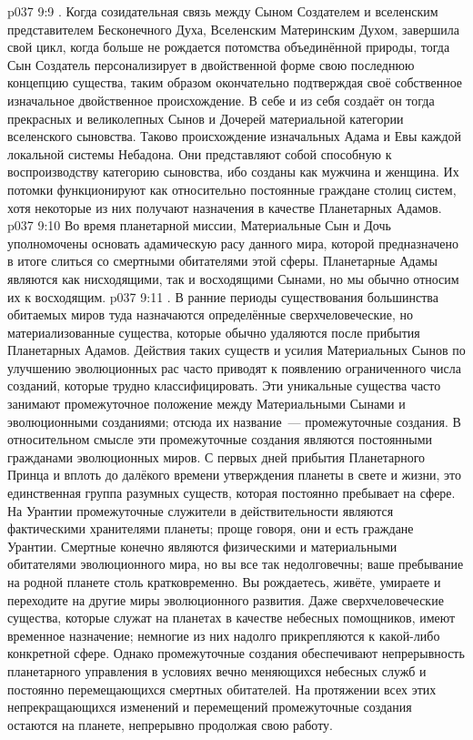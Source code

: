 \vs p037 9:9 \pc {}. Когда созидательная связь между Сыном Создателем и вселенским представителем Бесконечного Духа, Вселенским Материнским Духом, завершила свой цикл, когда больше не рождается потомства объединённой природы, тогда Сын Создатель персонализирует в двойственной форме свою последнюю концепцию существа, таким образом окончательно подтверждая своё собственное изначальное двойственное происхождение. В себе и из себя создаёт он тогда прекрасных и великолепных Сынов и Дочерей материальной категории вселенского сыновства. Таково происхождение изначальных Адама и Евы каждой локальной системы Небадона. Они представляют собой способную к воспроизводству категорию сыновства, ибо созданы как мужчина и женщина. Их потомки функционируют как относительно постоянные граждане столиц систем, хотя некоторые из них получают назначения в качестве Планетарных Адамов.
\vs p037 9:10 Во время планетарной миссии, Материальные Сын и Дочь уполномочены основать адамическую расу данного мира, которой предназначено в итоге слиться со смертными обитателями этой сферы. Планетарные Адамы являются как нисходящими, так и восходящими Сынами, но мы обычно относим их к восходящим.
\vs p037 9:11 \pc {}. В ранние периоды существования большинства обитаемых миров туда назначаются определённые сверхчеловеческие, но материализованные существа, которые обычно удаляются после прибытия Планетарных Адамов. Действия таких существ и усилия Материальных Сынов по улучшению эволюционных рас часто приводят к появлению ограниченного числа созданий, которые трудно классифицировать. Эти уникальные существа часто занимают промежуточное положение между Материальными Сынами и эволюционными созданиями; отсюда их название~--- промежуточные создания. В относительном смысле эти промежуточные создания являются постоянными гражданами эволюционных миров. С первых дней прибытия Планетарного Принца и вплоть до далёкого времени утверждения планеты в свете и жизни, это единственная группа разумных существ, которая постоянно пребывает на сфере. На Урантии промежуточные служители в действительности являются фактическими хранителями планеты; проще говоря, они и есть граждане Урантии. Смертные конечно являются физическими и материальными обитателями эволюционного мира, но вы все так недолговечны; ваше пребывание на родной планете столь кратковременно. Вы рождаетесь, живёте, умираете и переходите на другие миры эволюционного развития. Даже сверхчеловеческие существа, которые служат на планетах в качестве небесных помощников, имеют временное назначение; немногие из них надолго прикрепляются к какой\hyp{}либо конкретной сфере. Однако промежуточные создания обеспечивают непрерывность планетарного управления в условиях вечно меняющихся небесных служб и постоянно перемещающихся смертных обитателей. На протяжении всех этих непрекращающихся изменений и перемещений промежуточные создания остаются на планете, непрерывно продолжая свою работу.
